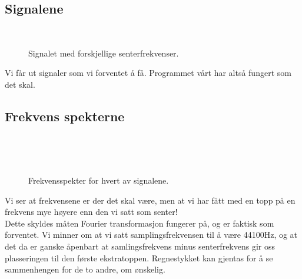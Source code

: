 \documentclass[12pt,norsk,a4paper]{article}
\begin{document}
\subsection{Signalene}

\begin{figure}[H]
\begin{center}
\\ 
\noindent 
{}
\end{center}
\caption[caption]{Signalet med forskjellige senterfrekvenser.} 
\end{figure}

Vi får ut signaler som vi forventet å få. Programmet vårt har altså fungert som det skal.


\subsection{Frekvens spekterne}

\begin{figure}[H]
\begin{center}
\\ 
\noindent 
{}
\end{center}
\caption[caption]{Frekvensspekter for hvert av signalene.}\
\end{figure}

Vi ser at frekvensene er der det skal være, men at vi har fått med en topp på en frekvens mye høyere enn den vi satt som senter!\\
Dette skyldes måten Fourier transformasjon fungerer på, og er faktisk som forventet. Vi minner om at vi satt samplingsfrekvensen til å være 44100Hz, og at det da er ganske åpenbart at samlingsfrekvens minus senterfrekvens gir oss plasseringen til den første ekstratoppen. Regnestykket kan gjentas for å se sammenhengen for de to andre, om ønskelig.
\end{document}
